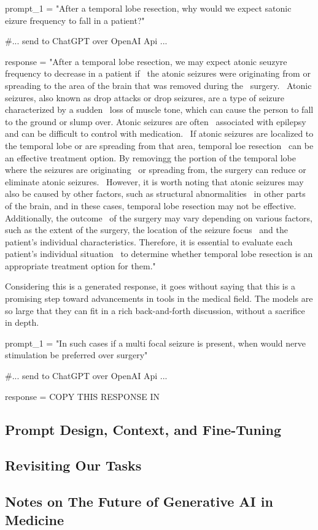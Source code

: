 \begin{python}
  prompt_1 = "After a temporal lobe resection, why would we expect satonic eizure frequency to fall in a patient?"

  #... send to ChatGPT over OpenAI Api ...

  response = "After a temporal lobe resection, we may expect atonic seuzyre frequency to decrease in a patient if \
    the atonic seizures were originating from or spreading to the area of the brain that was removed during the \
    surgery. \
        Atonic seizures, also known as drop attacks or drop seizures, are a type of seizure characterized by a sudden \
    loss of muscle tone, which can cause the person to fall to the ground or slump over. Atonic seizures are often \
    associated with epilepsy and can be difficult to control with medication. \
        If atonic seizures are localized to the temporal lobe or are spreading from that area, temporal loe resection \
    can be an effective treatment option. By removingg the portion of the temporal lobe where the seizures are originating \
    or spreading from, the surgery can reduce or eliminate atonic seizures. \
        However, it is worth noting that atonic seizures may also be caused by other factors, such as structural abnormalities \
    in other parts of the brain, and in these cases, temporal lobe resection may not be effective. Additionally, the outcome \
    of the surgery may vary depending on various factors, such as the extent of the surgery, the location of the seizure focus \
    and the patient's individual characteristics. Therefore, it is essential to evaluate each patient's individual situation \
    to determine whether temporal lobe resection is an appropriate treatment option for them."
\end{python}

Considering this is a generated response, it goes without saying that this is a promising step toward advancements in tools
in the medical field. The models are so large that they can fit in a rich back-and-forth discussion, without a sacrifice
in depth.

\begin{python}
    prompt_1 = "In such cases if a multi focal seizure is present, when would nerve stimulation be preferred over surgery"
  
    #... send to ChatGPT over OpenAI Api ...
  
    response = COPY THIS RESPONSE IN
  \end{python}

\subsection{Prompt Design, Context, and Fine-Tuning}

\subsection{Revisiting Our Tasks}

\subsection{Notes on The Future of Generative AI in Medicine}
